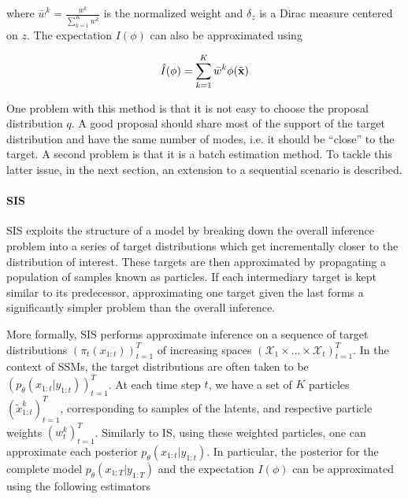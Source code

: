 where $\bar{w}^k = \frac{{w}^k}{\sum_{k=1}^K {w}^k}$ is the normalized weight and
$\delta_{z}$ is a Dirac measure centered on $z$.
The expectation $I(\phi)$ can also be approximated using

$$ \hat{I}(\phi) = \sum_{k=1}^K \bar{w}^k \phi(\tilde{\boldsymbol{\mathbf{x}}})$$


One problem with this method is that it is not easy to choose the proposal distribution $q$. A good proposal should share most of the support of the target distribution and have the same number of modes, i.e. it should be “close” to the target. A second problem is that it is a batch estimation method. To tackle this latter issue, in the next section, an extension to a sequential scenario is described.

\paragraph{\gls{SIS}}
\gls{SIS} exploits the structure of a model by breaking down the overall inference problem into a series of target distributions which get incrementally closer to the distribution of interest.
These targets are then approximated by propagating a population of samples known as particles. If each intermediary target is kept similar to its predecessor, approximating one target given the last forms a significantly simpler problem than the overall inference.

More formally, \gls{SIS} performs approximate inference on a sequence of target distributions
$\left(\pi_t(x_{1:t}) \right)_{t=1}^T$ of increasing spaces 
$\left(\mathcal{X}_1 \times \dots \times \mathcal{X}_t \right)_{t=1}^T$.
In the context of \gls{SSM}s, the target distributions are often taken to be
$\left(p_\theta(x_{1:t}|y_{1:t}) \right)_{t=1}^T$.
At each time step $t$, we have a set of $K$ particles $\left(\tilde{x}_{1:t}^k \right)_{t=1}^T$,
corresponding to samples of the latents, and respective particle weights $\left({w}_{t}^k \right)_{t=1}^T$.
Similarly to \gls{IS}, using these weighted particles, one can approximate each posterior
$p_\theta(x_{1:t}|y_{1:t})$.
In particular, the posterior for the complete model $p_\theta(x_{1:T}|y_{1:T})$ and the expectation $I(\phi)$ can be approximated using the following estimators

